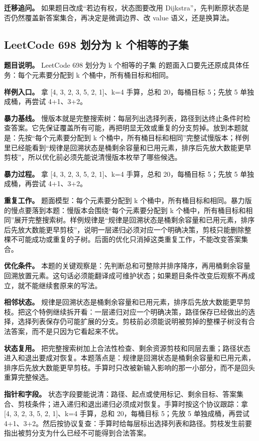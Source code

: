 \textbf{迁移追问。} 如果题目改成“若边有权，状态图要改用 Dijkstra”，先判断原状态是否仍然覆盖新答案集合，再决定是微调边界、改 value 语义，还是换算法。

\subsection{LeetCode 698 划分为 k 个相等的子集}

\textbf{题目说明。} LeetCode 698 划分为 k 个相等的子集 的题面入口要先还原成具体任务：每个元素要分配到 k 个桶中，所有桶目标和相同。

\textbf{样例入口。} 拿 [4, 3, 2, 3, 5, 2, 1]、k=4 手算，总和 20，每桶目标 5；先放 5 单独成桶，再尝试 4+1、3+2。

\textbf{暴力基线。} 慢版本就是完整搜索树：每层列出选择列表，路径到达终止条件时检查答案。它先保证覆盖所有可能，再把明显无效或重复的分支剪掉。放到本题就是：先按“每个元素要分配到 k 个桶中，所有桶目标和相同”完整试慢版本；样例里已经能看到“规律是回溯状态是桶剩余容量和已用元素，排序后先放大数能更早剪枝”，所以优化前必须先能说清慢版本枚举了哪些候选。

\textbf{暴力过程。} 拿 [4, 3, 2, 3, 5, 2, 1]、k=4 手算，总和 20，每桶目标 5；先放 5 单独成桶，再尝试 4+1、3+2。

\textbf{重复工作。} 题面模型：每个元素要分配到 k 个桶中，所有桶目标和相同。暴力版的慢点要落到本题：慢版本会围绕“每个元素要分配到 k 个桶中，所有桶目标和相同”展开完整搜索树。样例规律是“规律是回溯状态是桶剩余容量和已用元素，排序后先放大数能更早剪枝”，说明一层递归必须对应一个明确决策，剪枝只能删除整棵不可能成功或重复的子树。后面的优化只消掉这类重复工作，不能改变答案集合。

\textbf{优化条件。} 本题的关键观察是：先判断总和可整除并排序降序，再用桶剩余容量回溯放置元素。这句话必须能翻译成可维护状态；如果题目条件改变后观察不再成立，就不能继续套原来的写法。

\textbf{相邻状态。} 规律是回溯状态是桶剩余容量和已用元素，排序后先放大数能更早剪枝。把这个特例继续拆开看：一层递归对应一个明确决策，路径保存已经做出的选择，选择列表保存仍可能扩展的分支。剪枝前必须能说明被剪掉的整棵子树没有合法答案，而不是只因为它看起来不优。

\textbf{状态复用。} 把完整搜索树加上合法性检查、剩余资源剪枝和同层去重；路径状态进入和退出要成对恢复。本题落点是：规律是回溯状态是桶剩余容量和已用元素，排序后先放大数能更早剪枝。手算时只改被新输入影响的那一小部分，而不是回头重算完整候选。

\textbf{指针和字段。} 状态字段要能说清：路径、起点或使用标记、剩余目标、答案集合、剪枝条件；进入递归和退出递归必须成对恢复。手算时按这个协议跟踪：拿 [4, 3, 2, 3, 5, 2, 1]、k=4 手算，总和 20，每桶目标 5；先放 5 单独成桶，再尝试 4+1、3+2。然后按协议复查：手算时给每层标出选择列表和路径。剪枝发生前要指出被剪分支为什么已经不可能得到合法答案。

